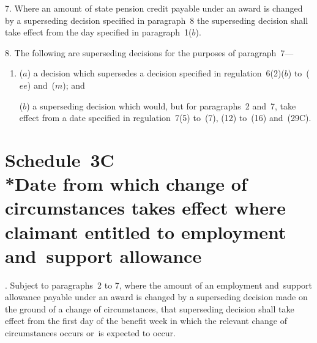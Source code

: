\documentclass[12pt,a4paper]{article}
\begin{document}

\medskip

7.  Where an amount of state pension credit payable under an award is changed by a superseding decision specified in paragraph~8 the superseding decision shall take effect from the day specified in paragraph~1($b$).


\medskip

8.  The following are superseding decisions for the purposes of paragraph~7—
\begin{enumerate}\item[]
($a$) a decision which supersedes a decision specified in regulation~6(2)($b$)  to~($ee$)  and~($m$); and

($b$) a superseding decision which would, but for paragraphs~2 and~7, take effect from a date specified in regulation~7(5) to~(7), (12) to~(16) and~(29C).
\end{enumerate}



\part[Schedule~3C --- Date from which change of circumstances takes effect where claimant entitled to employment and~support allowance]{Schedule~3C\\*Date from which change of circumstances takes effect where claimant entitled to employment and~support allowance}

\renewcommand\parthead{--- Schedule 3C}


\medskip

.  Subject to paragraphs~2 to 7, where the amount of an employment and~support allowance payable under an award is changed by a superseding decision made on the ground of a change of circumstances, that superseding decision shall take effect from the first day of the benefit week in which the relevant change of circumstances occurs or~is expected to occur.
\end{document}
